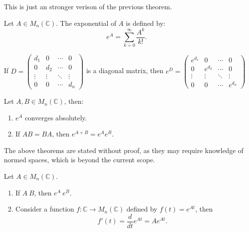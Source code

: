 \documentclass[12pt]{article}
\begin{document}
\begin{pfbox}
    This is just an stronger verison of the previous theorem.
\end{pfbox}



\begin{definition}
    Let $A\in M_n(\mathbb{C})$. The exponential of $A$ is defined by:
    \[e^{A}=\sum_{k=0}^{\infty}\frac{A^k}{k!}.\]
\end{definition}

\begin{theorem}
    If $D=\begin{pmatrix}
        d_1 & 0 & \cdots & 0\\
        0 & d_2 & \cdots & 0\\
        \vdots & \vdots & \ddots & \vdots\\
        0 & 0 & \cdots & d_n \end{pmatrix}$ is a diagonal matrix,
    then $e^D=\begin{pmatrix}
        e^{d_1} & 0 & \cdots & 0\\
        0 & e^{d_2} & \cdots & 0\\
        \vdots & \vdots & \ddots & \vdots\\
        0 & 0 & \cdots & e^{d_n} \end{pmatrix}$
\end{theorem}


\begin{theorem}
    Let $A,B\in M_n(\mathbb{C})$, then:
    \begin{enumerate}
        \item $e^A$ converges absolutely.
        \item If $AB=BA$, then $e^{A+B}=e^Ae^B$.
    \end{enumerate}
\end{theorem}

\begin{pfbox}
    The above theorems are stated without proof, as they may require knowledge of normed spaces, which is beyond the current scope.
\end{pfbox}

\begin{theorem}
    Let $A\in M_n(\mathbb{C})$.
    \begin{enumerate}
        \item If $A~B$, then $e^A ~ e^B$.
        \item Consider a function $f:\mathbb{C}\rightarrow M_n(\mathbb{C})$ defined by $f(t)=e^{At}$, then
        \[f'(t)=\frac{d}{dt}e^{At}=Ae^{At}.\]
    \end{enumerate}
\end{theorem}
\end{document}

